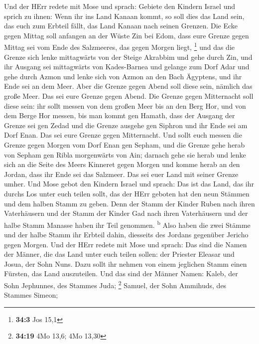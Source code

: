  Und der HErr redete mit Mose und sprach: 
Gebiete den Kindern Israel und sprich zu ihnen: Wenn ihr ins Land Kanaan
kommt, so soll dies das Land sein, das euch zum Erbteil fällt, das Land
Kanaan nach seinen Grenzen.  Die Ecke gegen Mittag soll
anfangen an der Wüste Zin bei Edom, dass eure Grenze gegen Mittag sei
vom Ende des Salzmeeres, das gegen Morgen liegt, \footnote{\textbf{34:3}
  Jos 15,1}  und das die Grenze sich lenke mittagwärts von
der Steige Akrabbim und gehe durch Zin, und ihr Ausgang sei mittagwärts
von Kades-Barnea und gelange zum Dorf Adar und gehe durch Azmon
 und lenke sich von Azmon an den Bach Ägyptens, und ihr
Ende sei an dem Meer.  Aber die Grenze gegen Abend soll
diese sein, nämlich das große Meer. Das sei eure Grenze gegen Abend.
 Die Grenze gegen Mitternacht soll diese sein: ihr sollt
messen von dem großen Meer bis an den Berg Hor,  und von
dem Berge Hor messen, bis man kommt gen Hamath, dass der Ausgang der
Grenze sei gen Zedad  und die Grenze ausgehe gen Siphron
und ihr Ende sei am Dorf Enan. Das sei eure Grenze gegen Mitternacht.
 Und sollt euch messen die Grenze gegen Morgen vom Dorf
Enan gen Sepham,  und die Grenze gehe herab von Sepham
gen Ribla morgenwärts von Ain; darnach gehe sie herab und lenke sich an
die Seite des Meers Kinneret gegen Morgen  und komme
herab an den Jordan, dass ihr Ende sei das Salzmeer. Das sei euer Land
mit seiner Grenze umher.  Und Mose gebot den Kindern
Israel und sprach: Das ist das Land, das ihr durchs Los unter euch
teilen sollt, das der HErr geboten hat den neun Stämmen und dem halben
Stamm zu geben.  Denn der Stamm der Kinder Ruben nach
ihren Vaterhäusern und der Stamm der Kinder Gad nach ihren Vaterhäusern
und der halbe Stamm Manasse haben ihr Teil genommen. \textsuperscript{b}
 Also haben die zwei Stämme und der halbe Stamm ihr
Erbteil dahin, diesseits des Jordans gegenüber Jericho gegen Morgen.
 Und der HErr redete mit Mose und sprach: 
Das sind die Namen der Männer, die das Land unter euch teilen sollen:
der Priester Eleasar und Josua, der Sohn Nuns.  Dazu
sollt ihr nehmen von einem jeglichen Stamm einen Fürsten, das Land
auszuteilen.  Und das sind der Männer Namen: Kaleb, der
Sohn Jephunnes, des Stammes Juda; \footnote{\textbf{34:19} 4Mo 13,6; 4Mo
  13,30}  Samuel, der Sohn Ammihuds, des Stammes Simeon;
